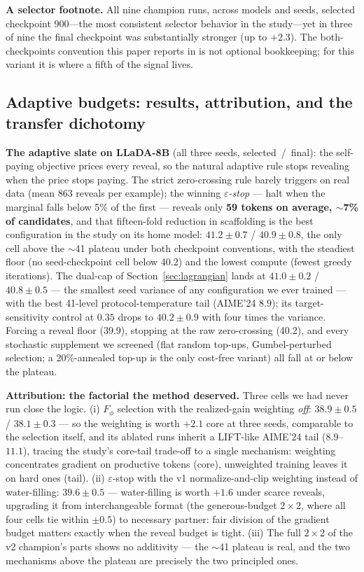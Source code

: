 \documentclass{article} %
\begin{document}
\textbf{A selector footnote.} All nine champion runs, across models and seeds, selected checkpoint 900---the most consistent selector behavior in the study---yet in three of nine the final checkpoint was substantially stronger (up to $+2.3$). The both-checkpoints convention this paper reports in is not optional bookkeeping; for this variant it is where a fifth of the signal lives.

\subsection{Adaptive budgets: results, attribution, and the transfer dichotomy}
\label{sec:v3results}

\textbf{The adaptive slate on LLaDA-8B} (all three seeds, selected~/~final): the self-paying objective prices every reveal, so the natural adaptive rule stops revealing when the price stops paying. The strict zero-crossing rule barely triggers on real data (mean 863 reveals per example); the winning \emph{$\varepsilon$-stop} --- halt when the marginal falls below 5\% of the first --- reveals only \textbf{59 tokens on average, $\sim$7\% of candidates}, and that fifteen-fold reduction in scaffolding is the best configuration in the study on its home model: $41.2 \pm 0.7$ / $40.9 \pm 0.8$, the only cell above the $\sim$41 plateau under both checkpoint conventions, with the steadiest floor (no seed-checkpoint cell below 40.2) and the lowest compute (fewest greedy iterations). The dual-cap of Section~\ref{sec:lagrangian} lands at $41.0 \pm 0.2$ / $40.8 \pm 0.5$ --- the smallest seed variance of any configuration we ever trained --- with the best 41-level protocol-temperature tail (AIME'24 $8.9$); its target-sensitivity control at $0.35$ drops to $40.2 \pm 0.9$ with four times the variance. Forcing a reveal floor (39.9), stopping at the raw zero-crossing (40.2), and every stochastic supplement we screened (flat random top-ups, Gumbel-perturbed selection; a 20\%-annealed top-up is the only cost-free variant) all fall at or below the plateau.

\textbf{Attribution: the factorial the method deserved.} Three cells we had never run close the logic. (i) $F_\phi$ selection with the realized-gain weighting \emph{off}: $38.9 \pm 0.5$ / $38.1 \pm 0.3$ --- so the weighting is worth $+2.1$ core at three seeds, comparable to the selection itself, and its ablated runs inherit a LIFT-like AIME'24 tail ($8.9$--$11.1$), tracing the study's core-tail trade-off to a single mechanism: weighting concentrates gradient on productive tokens (core), unweighted training leaves it on hard ones (tail). (ii) $\varepsilon$-stop with the v1 normalize-and-clip weighting instead of water-filling: $39.6 \pm 0.5$ --- water-filling is worth $+1.6$ under scarce reveals, upgrading it from interchangeable format (the generous-budget $2{\times}2$, where all four cells tie within $\pm 0.5$) to necessary partner: fair division of the gradient budget matters exactly when the reveal budget is tight. (iii) The full $2{\times}2$ of the v2 champion's parts shows no additivity --- the $\sim$41 plateau is real, and the two mechanisms above the plateau are precisely the two principled ones.
\end{document}

